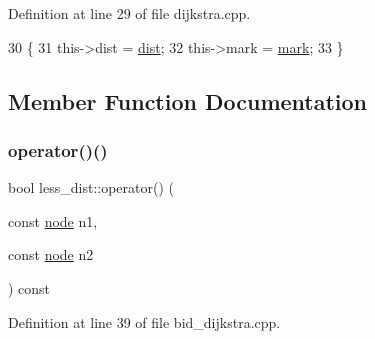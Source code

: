 Definition at line 29 of file dijkstra.\+cpp.


\begin{DoxyCode}
30     \{
31     this->dist = \mbox{\hyperlink{classless__dist_a5e27ffa3cd5b99bcf5c205fc021ddbb8}{dist}};
32     this->mark = \mbox{\hyperlink{classless__dist_a7905c2d559b1b629175fc810c643375c}{mark}};
33     \}
\end{DoxyCode}


\subsection{Member Function Documentation}
\mbox{\label{classless__dist_ad60cec2a03ca609f0f4af0818ee9caeb}} 
\subsubsection{\texorpdfstring{operator()()}{operator()()}\hspace{0.1cm}{\footnotesize\ttfamily [1/2]}}
{\footnotesize\ttfamily bool less\+\_\+dist\+::operator() (\begin{DoxyParamCaption}\item[{const \mbox{\hyperlink{classnode}{node}}}]{n1,  }\item[{const \mbox{\hyperlink{classnode}{node}}}]{n2 }\end{DoxyParamCaption}) const\hspace{0.3cm}{\ttfamily [inline]}}



Definition at line 39 of file bid\+\_\+dijkstra.\+cpp.


